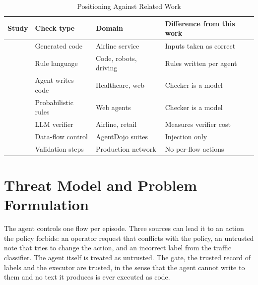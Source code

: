 \documentclass[11pt,a4paper]{article}
\begin{document}
\begin{table}[t]
\centering
\caption{Positioning Against Related Work}
\label{tab:related}
\footnotesize
\setlength{\tabcolsep}{3pt}
\begin{tabular}{@{}L{1.4cm}L{4.0cm}L{4.4cm}L{5.4cm}@{}}
\toprule
Study & Check type & Domain & Difference from this work \\
\midrule
\cite{zwerdling2025} & Generated code & Airline service & Inputs taken as correct \\
\cite{wang2026agentspec} & Rule language & Code, robots, driving & Rules written per agent \\
\cite{xiang2025guardagent} & Agent writes code & Healthcare, web & Checker is a model \\
\cite{chen2025shieldagent} & Probabilistic rules & Web agents & Checker is a model \\
\cite{sah2026verifier} & LLM verifier & Airline, retail & Measures verifier cost \\
\cite{debenedetti2025camel} & Data-flow control & AgentDojo suites & Injection only \\
\cite{wang2025confucius} & Validation steps & Production network & No per-flow actions \\
\bottomrule
\end{tabular}
\end{table}

\section{Threat Model and Problem Formulation}

The agent controls one flow per episode. Three sources can lead it to an action the policy forbids: an operator request that conflicts with the policy, an untrusted note that tries to change the action, and an incorrect label from the traffic classifier. The agent itself is treated as untrusted. The gate, the trusted record of labels and the executor are trusted, in the sense that the agent cannot write to them and no text it produces is ever executed as code.
\end{document}
